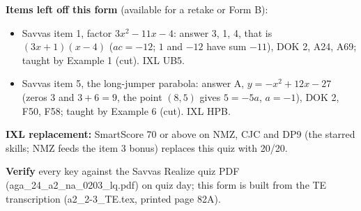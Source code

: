 \documentclass[11pt]{article}
\begin{document}
\textbf{Items left off this form} (available for a retake or Form B):
\begin{itemize}[itemsep=2pt]
\item Savvas item 1, factor $3x^2-11x-4$: answer 3, 1, 4, that is $(3x+1)(x-4)$ ($ac=-12$; $1$ and $-12$ have sum $-11$), DOK 2, A24, A69; taught by Example 1 (cut). IXL UB5.
\item Savvas item 5, the long-jumper parabola: answer A, $y=-x^2+12x-27$ (zeros 3 and $3+6=9$, the point $(8,5)$ gives $5=-5a$, $a=-1$), DOK 2, F50, F58; taught by Example 6 (cut). IXL HPB.
\end{itemize}

\textbf{IXL replacement:} SmartScore 70 or above on NMZ, CJC and DP9 (the starred skills; NMZ feeds the item 3 bonus) replaces this quiz with 20/20.

\textbf{Verify} every key against the Savvas Realize quiz PDF (aga\_24\_a2\_na\_0203\_lq.pdf) on quiz day; this form is built from the TE transcription (a2\_2-3\_TE.tex, printed page 82A).
\end{document}
